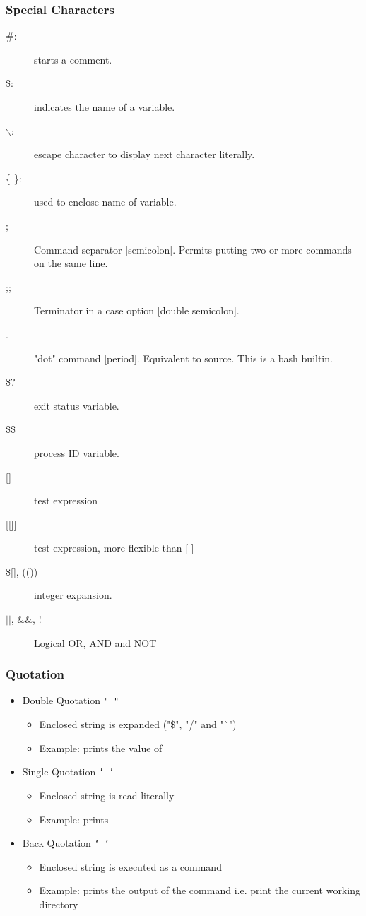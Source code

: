 \documentclass[10pt,t]{beamer}
\begin{document}
\begin{frame}
  \frametitle{Special Characters}
  \begin{description}
    \item[\#:] starts a comment.
    \item[\$:] indicates the name of a variable.
    \item[$\backslash$:] escape character to display next character literally.
    \item[\{ \}:] used to enclose name of variable.
    \item[;] Command separator [semicolon]. Permits putting two or more commands on the same line.
    \item[;;] Terminator in a case option [double semicolon].
    \item[.] "dot" command [period]. Equivalent to source. This is a bash builtin.
    \item[\$?] exit status variable.
    \item[\$\$] process ID variable.
    \item[{[\quad]}] test expression
    \item[{[[\quad]]}] test expression, more flexible than [ ]
    \item[{\$[\quad], ((\quad))}] integer expansion.
    \item[{$||$, \&\&, !}] Logical OR, AND and NOT
  \end{description}
\end{frame}

\begin{frame}[fragile]
  \frametitle{Quotation}
  \begin{itemize}
    \item Double Quotation \texttt{" "}
    \begin{itemize}
        \item Enclosed string is expanded ("\$", "/" and "`")
        \item Example:  prints the value of 
    \end{itemize}
    \item Single Quotation \texttt{' '}
    \begin{itemize}
        \item Enclosed string is read literally
        \item Example:  prints 
    \end{itemize}
    \item Back Quotation \texttt{` `}
    \begin{itemize}
        \item Enclosed string is executed as a command
        \item Example:  prints the output of the  command i.e. print the current working directory
    \end{itemize}
  \end{itemize}
\end{frame}
\end{document}
